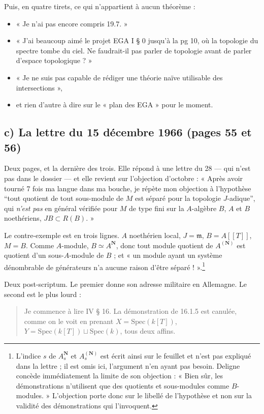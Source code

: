 \documentclass[11pt,a4paper]{article}
\begin{document}
Puis, en quatre tirets, ce qui n'appartient à aucun théorème :

\begin{itemize}
  \item « Je n'ai pas encore compris 19.7. »
  \item « J'ai beaucoup aimé le projet EGA I § 0 jusqu'à la pg 10, où la
  topologie du spectre tombe du ciel. Ne faudrait-il pas parler de topologie
  avant de parler d'espace topologique ? »
  \item « Je ne suis pas capable de rédiger une théorie naïve utilisable des
  intersections »,
  \item et rien d'autre à dire sur le « plan des EGA » pour le moment.
\end{itemize}

\subsection*{c) La lettre du 15 décembre 1966 (pages 55 et 56)}

Deux pages, et la dernière des trois. Elle répond à une lettre du 28 — qui n'est
pas dans le dossier — et elle revient sur l'objection d'octobre : « Après avoir
tourné 7 fois ma langue dans ma bouche, je répète mon objection à l'hypothèse
“tout quotient de tout sous-module de $M$ est séparé pour la topologie
$J$-adique”, qui \emph{n'est pas} en général vérifiée pour $M$ de type fini sur
la $A$-algèbre $B$, $A$ et $B$ noethériens, $JB \subset R(B)$. »

Le contre-exemple est en trois lignes. $A$ noethérien local, $J = \mathfrak{m}$,
$B = A[[T]]$, $M = B$. Comme $A$-module, $B \simeq A^{\mathbf{N}}$, donc tout
module quotient de $A^{(\mathbf{N})}$ est quotient d'un sous-$A$-module de $B$ ;
et « un module ayant un système dénombrable de générateurs n'a aucune raison
d'être séparé ! ».\footnote{L'indice $s$ de $A_{s}^{\mathbf{N}}$ et
$A_{s}^{(\mathbf{N})}$ est écrit ainsi sur le feuillet et n'est pas expliqué
dans la lettre ; il est omis ici, l'argument n'en ayant pas besoin. Deligne
concède immédiatement la limite de son objection : « Bien sûr, les
démonstrations n'utilisent que des quotients et sous-modules comme
$B$-modules. » L'objection porte donc sur le libellé de l'hypothèse et non sur
la validité des démonstrations qui l'invoquent.}

Deux post-scriptum. Le premier donne son adresse militaire en Allemagne. Le
second est le plus lourd :

\begin{quote}
Je commence à lire IV § 16. La démonstration de 16.1.5 est canulée, comme on le
voit en prenant $X = \mathrm{Spec}(k[T])$, $Y = \mathrm{Spec}(k[T]) \sqcup
\mathrm{Spec}(k)$, tous deux affins.
\end{quote}
\end{document}
